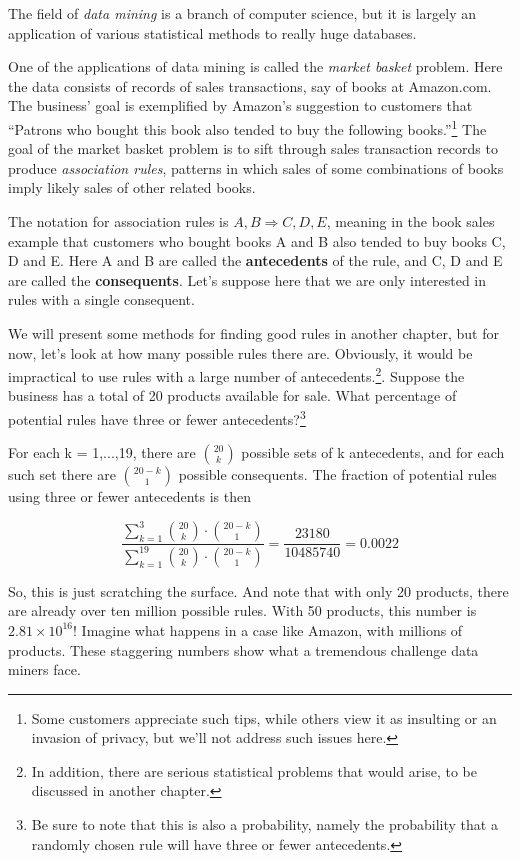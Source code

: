 The field of {\it data mining} is a branch of computer science, but it
is largely an application of various statistical methods to really huge
databases.

One of the applications of data mining is called the {\it market basket}
problem.  Here the data consists of records of sales transactions, say
of books at Amazon.com.  The business' goal is exemplified by Amazon's
suggestion to customers that ``Patrons who bought this book also tended
to buy the following books.''\footnote{Some customers appreciate such tips,
while others view it as insulting or an invasion of privacy, but we'll
not address such issues here.}  The goal of the market basket problem is
to sift through sales transaction records to produce {\it association
rules}, patterns in which sales of some combinations of books imply
likely sales of other related books.

The notation for association rules is $A,B \Rightarrow C,D,E$, meaning
in the book sales example that customers who bought books A and B also
tended to buy books C, D and E.  Here A and B are called the {\bf
antecedents} of the rule, and C, D and E are called the {\bf
consequents}.  Let's suppose here that we are only interested in rules
with a single consequent.  

We will present some methods for finding good rules in another chapter, but
for now, let's look at how many possible rules there are.  Obviously, it
would be impractical to use rules with a large number of
antecedents.\footnote{In addition, there are serious statistical
problems that would arise, to be discussed in another chapter.}.  Suppose
the business has a total of 20 products available for sale.  What
percentage of potential rules have three or fewer
antecedents?\footnote{Be sure to note that this is also a probability,
namely the probability that a randomly chosen rule will have three or
fewer antecedents.}

For each k = 1,...,19, there are $\binom{20}{k}$ possible sets of k
antecedents, and for each such set there are $\binom{20-k}{1}$ possible
consequents.  The fraction of potential rules using three or fewer
antecedents is then

\begin{equation}
\frac
{\sum_{k=1}^{3} \binom{20}{k} \cdot \binom{20-k}{1}}
{\sum_{k=1}^{19} \binom{20}{k} \cdot \binom{20-k}{1}}
= \frac{23180}{10485740}
= 0.0022
\end{equation}

So, this is just scratching the surface.  And note that with only 20
products, there are already over ten million possible rules.  With 50
products, this number is $2.81 \times 10^{16}$!  Imagine what happens in
a case like Amazon, with millions of products.  These staggering numbers
show what a tremendous challenge data miners face.




